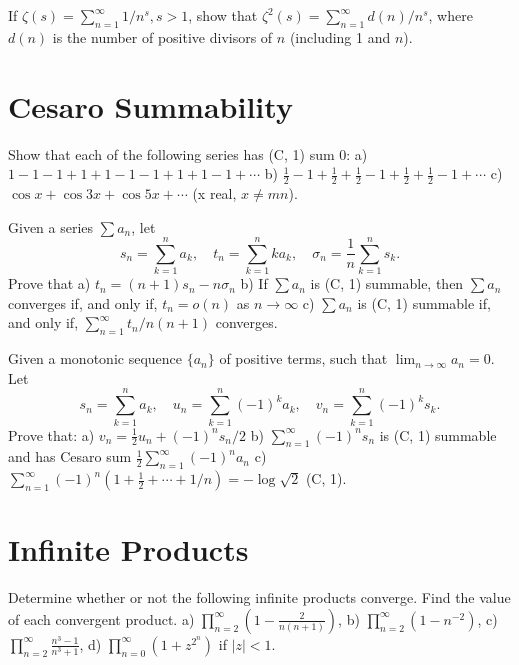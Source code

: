 \begin{problembox}
If \(\zeta(s) = \sum_{n=1}^{\infty} 1/n^s, s > 1\), show that \(\zeta^2(s) = \sum_{n=1}^{\infty} d(n) / n^s\), where \(d(n)\) is the number of positive divisors of \(n\) (including 1 and \(n\)).
\end{problembox}

\section{Cesaro Summability}

\begin{problembox}
Show that each of the following series has (C, 1) sum 0:
a) \(1 - 1 - 1 + 1 + 1 - 1 - 1 + 1 + 1 - 1 + \cdots\)
b) \(\frac{1}{2} - 1 + \frac{1}{2} + \frac{1}{2} - 1 + \frac{1}{2} + \frac{1}{2} - 1 + \cdots\)
c) \(\cos x + \cos 3x + \cos 5x + \cdots\) (x real, \(x \neq mn\)).
\end{problembox}

\begin{problembox}
Given a series \(\sum a_n\), let
\[s_n = \sum_{k=1}^{n} a_k, \quad t_n = \sum_{k=1}^{n} k a_k, \quad \sigma_n = \frac{1}{n} \sum_{k=1}^{n} s_k.\]
Prove that
a) \(t_n = (n + 1)s_n - n\sigma_n\)
b) If \(\sum a_n\) is (C, 1) summable, then \(\sum a_n\) converges if, and only if, \(t_n = o(n)\) as \(n \to \infty\)
c) \(\sum a_n\) is (C, 1) summable if, and only if, \(\sum_{n=1}^{\infty} t_n / n(n + 1)\) converges.
\end{problembox}

\begin{problembox}
Given a monotonic sequence \(\{a_n\}\) of positive terms, such that \(\lim_{n \to \infty} a_n = 0\). Let
\[s_n = \sum_{k=1}^{n} a_k, \quad u_n = \sum_{k=1}^{n} (-1)^k a_k, \quad v_n = \sum_{k=1}^{n} (-1)^k s_k.\]
Prove that:
a) \(v_n = \frac{1}{2} u_n + (-1)^n s_n / 2\)
b) \(\sum_{n=1}^{\infty} (-1)^n s_n\) is (C, 1) summable and has Cesaro sum \(\frac{1}{2} \sum_{n=1}^{\infty} (-1)^n a_n\)
c) \(\sum_{n=1}^{\infty} (-1)^n (1 + \frac{1}{2} + \cdots + 1/n) = -\log \sqrt{2}\) (C, 1).
\end{problembox}

\section{Infinite Products}

\begin{problembox}
Determine whether or not the following infinite products converge. Find the value of each convergent product.
a) \(\prod_{n=2}^{\infty} \left( 1 - \frac{2}{n(n+1)} \right)\), 
b) \(\prod_{n=2}^{\infty} (1 - n^{-2})\),
c) \(\prod_{n=2}^{\infty} \frac{n^3 - 1}{n^3 + 1}\), 
d) \(\prod_{n=0}^{\infty} (1 + z^{2^n})\) if \(|z| < 1\).
\end{problembox}

